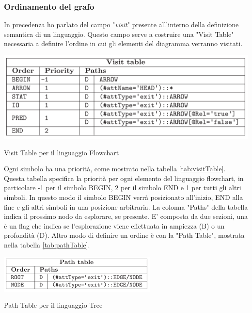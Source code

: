             \subsubsection{Ordinamento del grafo}
                In precedenza ho parlato del campo "\textit{visit}" presente all'interno della definizione semantica di un linguaggio. Questo campo serve a costruire una "Visit Table" necessaria a definire l'ordine in cui gli elementi del diagramma verranno visitati.

                \begin{table}[htbp]
                    \centering
                    \includegraphics[scale=0.6]{Figure/visitTable.PNG}
                    \caption{Visit Table per il linguaggio Flowchart}
                    \label{tab:visitTable}
                \end{table}

                Ogni simbolo ha una priorità, come mostrato nella tabella \ref{tab:visitTable}. Questa tabella specifica la priorità per ogni elemento del linguaggio flowchart, in particolare -1 per il simbolo BEGIN, 2 per il simbolo END e 1 per tutti gli altri simboli. In questo modo il simbolo BEGIN verrà posizionato all'inizio, END alla fine e gli altri simboli in una posizione arbitraria. 
                \newline
                La colonna "Paths" della tabella indica il prossimo nodo da esplorare, se presente. E' composta da due sezioni, una è un flag che indica se l'esplorazione viene effettuata in ampiezza (B) o un profondità (D).
                \newline
                Altro modo di definire un ordine è con la "Path Table", mostrata nella tabella \ref{tab:pathTable}. 

                \begin{table}[htbp]
                    \centering
                    \includegraphics[scale=0.85]{Figure/pathTable.PNG}
                    \caption{Path Table per il linguaggio Tree}
                    \label{tab:pathTable}
                \end{table}

